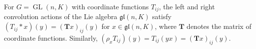 For $G = \operatorname{GL}(n, K)$ with coordinate functions $T_{ij}$, the left and right convolution actions of the Lie algebra $\mathfrak{gl}(n, K)$ satisfy $(T_{ij} * x)(y) = (\mathbf{T}x)_{ij}(y)$ for $x \in \mathfrak{gl}(n, K)$, where $\mathbf{T}$ denotes the matrix of coordinate functions. Similarly, $(\rho_x T_{ij})(y) = T_{ij}(yx) = (\mathbf{T}x)_{ij}(y)$.
